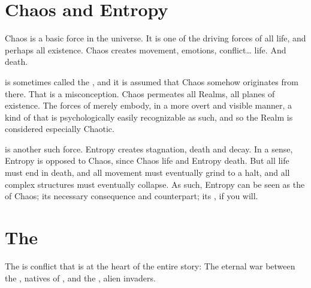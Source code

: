 \section{Chaos and Entropy}
Chaos is a basic force in the universe. 
It is one of the driving forces of all life, and perhaps all existence. 
Chaos creates movement, emotions, conflict\ldots{} life. 
And death. 

\Machai{} is sometimes called the , and it is assumed that Chaos somehow originates from there. 
That is a misconception. 
Chaos permeates all Realms, all planes of existence. 
The forces of \Machai{} merely embody, in a more overt and visible manner, a kind of  that is psychologically easily recognizable as such, and so the Realm is considered especially Chaotic. 


 is another such force. 
Entropy creates stagnation, death and decay. 
In a sense, Entropy is opposed to Chaos, since Chaos  life and Entropy  death. 
But all life must end in death, and all movement must eventually grind to a halt, and all complex structures must eventually collapse. 
As such, Entropy can be seen as the  of Chaos; its necessary consequence and counterpart; its , if you will. 















\section{The \Feud}
The \feud{} is conflict that is at the heart of the entire story: 
The eternal war between the \dragons, natives of \Miith{}, and the \banes, alien invaders. 

